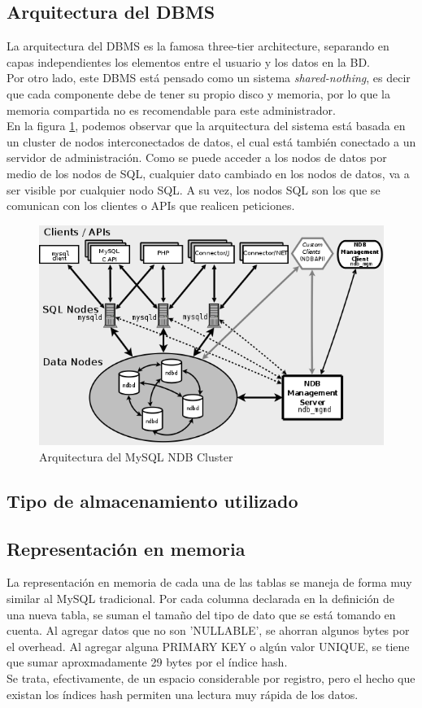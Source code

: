 \documentclass{acmart}
\begin{document}
\subsection{Arquitectura del DBMS}
La arquitectura del DBMS es la famosa three-tier architecture, separando en capas independientes los elementos entre el usuario y los datos en la BD.\\
Por otro lado, este DBMS está pensado como un sistema \textit{shared-nothing}, es decir que cada componente debe de tener su propio disco y memoria, por lo que la memoria compartida no es recomendable para este administrador.\\
En la figura \ref{mysqlarch}, podemos observar que la arquitectura del sistema está basada en un cluster de nodos interconectados de datos, el cual está también conectado a un servidor de administración. Como se puede acceder a los nodos de datos por medio de los nodos de SQL, cualquier dato cambiado en los nodos de datos, va a ser visible por cualquier nodo SQL. A su vez, los nodos SQL son los que se comunican con los clientes o APIs que realicen peticiones.
\begin{figure}
    \centering
    \includegraphics[width=0.4\linewidth]{mysqlndbarch.png}
    \caption{Arquitectura del MySQL NDB Cluster}
    \label{mysqlarch}
\end{figure}
\subsection{Tipo de almacenamiento utilizado}
\subsection{Representación en memoria}
La representación en memoria de cada una de las tablas se maneja de forma muy similar al MySQL tradicional. Por cada columna declarada en la definición de una nueva tabla, se suman el tamaño del tipo de dato que se está tomando en cuenta. Al agregar datos que no son 'NULLABLE', se ahorran algunos bytes por el overhead. Al agregar alguna PRIMARY KEY o algún valor UNIQUE, se tiene que sumar aproxmadamente 29 bytes por el índice hash.\\
Se trata, efectivamente, de un espacio considerable por registro, pero el hecho que existan los índices hash permiten una lectura muy rápida de los datos.
\end{document}
